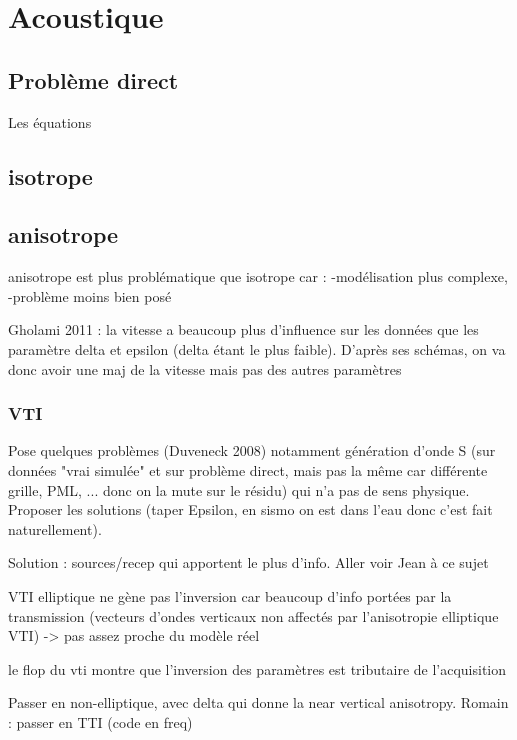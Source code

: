 \section{Acoustique}
\subsection{Problème direct}
Les équations 

\subsection{isotrope}

\subsection{anisotrope}



anisotrope est plus problématique que isotrope car : 
-modélisation plus complexe,
-problème moins bien posé

Gholami 2011 : la vitesse a beaucoup plus d'influence sur les données que les paramètre delta et epsilon (delta étant le plus faible). D'après ses schémas, on va donc avoir une maj de la vitesse mais pas des autres paramètres

\subsubsection{VTI}
Pose quelques problèmes (Duveneck 2008) notamment génération d'onde S (sur données "vrai simulée"  et sur problème direct, mais pas la même car différente grille, PML, ... donc on la mute sur le résidu) qui n'a pas de sens physique. Proposer les solutions (taper Epsilon, en sismo on est dans l'eau donc c'est fait naturellement).


Solution : sources/recep qui apportent le plus d'info. Aller voir Jean à ce sujet


VTI elliptique ne gène pas l'inversion car beaucoup d'info portées par la transmission (vecteurs d'ondes verticaux non affectés par l'anisotropie elliptique VTI)  -> pas assez proche du modèle réel

le flop du vti montre que l'inversion des paramètres est tributaire de l'acquisition

Passer en non-elliptique, avec delta qui donne la near vertical anisotropy. Romain : passer en TTI (code en freq)

